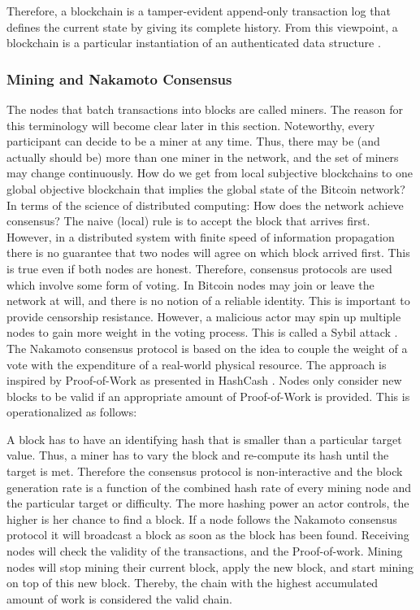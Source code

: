 Therefore, a blockchain is a tamper-evident append-only transaction log that defines the current state by giving its complete history. From this viewpoint, a blockchain is a particular instantiation of an authenticated data structure \parencite{miller14gpads}.

\subsubsection{Mining and Nakamoto Consensus}
\label{sec:mining}

The nodes that batch transactions into blocks are called miners. The reason for this terminology will become clear later in this section. Noteworthy, every participant can decide to be a miner at any time. Thus, there may be (and actually should be) more than one miner in the network, and the set of miners may change continuously. How do we get from local subjective blockchains to one global objective blockchain that implies the global state of the Bitcoin network? In terms of the science of distributed computing: How does the network achieve consensus?
The naive (local) rule is to accept the block that arrives first. However, in a distributed system with finite speed of information propagation there is no guarantee that two nodes will agree on which block arrived first. This is true even if both nodes are honest. Therefore, consensus protocols are used which involve some form of voting. In Bitcoin nodes may join or leave the network at will, and there is no notion of a reliable identity. This is important to provide censorship resistance. However, a malicious actor may spin up multiple nodes to gain more weight in the voting process. This is called a Sybil attack \parencite{douceur2002sybil}. The Nakamoto consensus protocol is based on the idea to couple the weight of a vote with the expenditure of a real-world physical resource. The approach is inspired by Proof-of-Work as presented in HashCash \parencite{back2002hashcash}. Nodes only consider new blocks to be valid if an appropriate amount of Proof-of-Work is provided. This is operationalized as follows:

A block has to have an identifying hash that is smaller than a particular target value. Thus, a miner has to vary the block and re-compute its hash until the target is met. Therefore the consensus protocol is non-interactive and the block generation rate is a function of the combined hash rate of every mining node and the particular target or difficulty. The more hashing power an actor controls, the higher is her chance to find a block. If a node follows the Nakamoto consensus protocol it will broadcast a block as soon as the block has been found. Receiving nodes will check the validity of the transactions, and the Proof-of-work. Mining nodes will stop mining their current block, apply the new block, and start mining on top of this new block. Thereby, the chain with the highest accumulated amount of work is considered the valid chain. 

